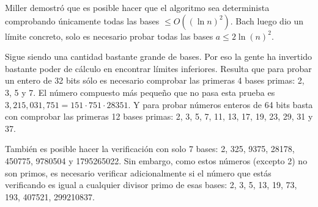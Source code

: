 Miller demostró que es posible hacer que el algoritmo sea determinista comprobando únicamente todas las bases $\le O((\ln n)^2)$. Bach luego dio un límite concreto, solo es necesario probar todas las bases $a \le 2 \ln(n)^2$.

Sigue siendo una cantidad bastante grande de bases. Por eso la gente ha invertido bastante poder de cálculo en encontrar límites inferiores. Resulta que para probar un entero de 32 bits sólo es necesario comprobar las primeras 4 bases primas: 2, 3, 5 y 7. El número compuesto más pequeño que no pasa esta prueba es $3,215,031,751 = 151 \cdot 751 \cdot 28351$. Y para probar números enteros de 64 bits basta con comprobar las primeras 12 bases primas: 2, 3, 5, 7, 11, 13, 17, 19, 23, 29, 31 y 37.

También es posible hacer la verificación con solo 7 bases: 2, 325, 9375, 28178, 450775, 9780504 y 1795265022. Sin embargo, como estos números (excepto 2) no son primos, es necesario verificar adicionalmente si el número que estás verificando es igual a cualquier divisor primo de esas bases: 2, 3, 5, 13, 19, 73, 193, 407521, 299210837.
